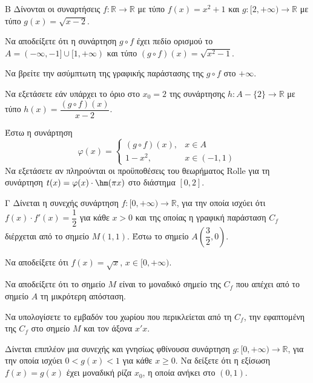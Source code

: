 \begin{thema}{Β}
Δίνονται οι συναρτήσεις $f : \mathbb{R} \to \mathbb{R}$ με τύπο $f(x) = x^2 + 1$ και $g : [2, +\infty) \to \mathbb{R}$ με τύπο $g(x) = \sqrt{x - 2}$.
\begin{erwthma}
    \item Να αποδείξετε ότι η συνάρτηση $g \circ f$ έχει πεδίο ορισμού το $A = (-\infty, -1] \cup [1, +\infty)$ και τύπο $(g \circ f)(x) = \sqrt{x^2 - 1}$. 
    \item Να βρείτε την ασύμπτωτη της γραφικής παράστασης της $g \circ f$ στο $+\infty$. 
    \item Να εξετάσετε εάν υπάρχει το όριο στο $x_0 = 2$ της συνάρτησης $h : A - \{2\} \to \mathbb{R}$ με τύπο $h(x) = \dfrac{(g \circ f)(x)}{x - 2}$. 
    \item Έστω η συνάρτηση
    \[
    \varphi(x) = \begin{cases} (g \circ f)(x), & x \in A \\ 1 - x^2, & x \in (-1, 1) \end{cases}
    \]
    Να εξετάσετε αν πληρούνται οι προϋποθέσεις του θεωρήματος Rolle για τη συνάρτηση $t(x) = \varphi(x) \cdot \hm(\pi x)$ στο διάστημα $[0, 2]$. 
\end{erwthma}
\end{thema}
\begin{thema}{Γ}
Δίνεται η συνεχής συνάρτηση $f : [0, +\infty) \to \mathbb{R}$, για την οποία ισχύει ότι $f(x) \cdot f'(x) = \dfrac{1}{2}$ για κάθε $x > 0$ και της οποίας η γραφική παράσταση $C_f$ διέρχεται από το σημείο $M(1, 1)$. Έστω το σημείο $A\!\left(\dfrac{3}{2}, 0\right)$.
\begin{erwthma}
    \item Να αποδείξετε ότι $f(x) = \sqrt{x}$, $x \in [0, +\infty)$. 
    \item Να αποδείξετε ότι το σημείο $M$ είναι το μοναδικό σημείο της $C_f$ που απέχει από το σημείο $A$ τη μικρότερη απόσταση. 
    \item Να υπολογίσετε το εμβαδόν του χωρίου που περικλείεται από τη $C_f$, την εφαπτομένη της $C_f$ στο σημείο $M$ και τον άξονα $x'x$. 
    \item Δίνεται επιπλέον μια συνεχής και γνησίως φθίνουσα συνάρτηση $g : [0, +\infty) \to \mathbb{R}$, για την οποία ισχύει $0 < g(x) < 1$ για κάθε $x \geq 0$. Να δείξετε ότι η εξίσωση $f(x) = g(x)$ έχει μοναδική ρίζα $x_0$, η οποία ανήκει στο $(0, 1)$. 
\end{erwthma}
\end{thema}
